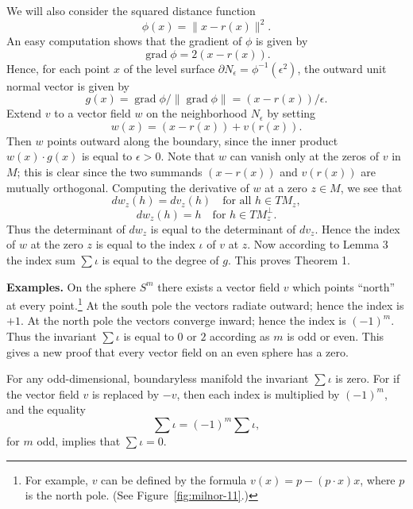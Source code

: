 We will also consider the squared distance function
\[
\phi(x) = \|x - r(x)\|^2.
\]
An easy computation shows that the gradient of $\phi$ is given by
\[
\operatorname{grad} \phi = 2(x - r(x)).
\]
Hence, for each point $x$ of the level surface $\partial N_\epsilon = \phi^{-1}(\epsilon^2)$, the outward unit normal vector is given by
\[
g(x) = \operatorname{grad} \phi / \|\operatorname{grad} \phi\| = (x - r(x))/\epsilon.
\]
Extend $v$ to a vector field $w$ on the neighborhood $N_\epsilon$ by setting
\[
w(x) = (x - r(x)) + v(r(x)).
\]
Then $w$ points outward along the boundary, since the inner product $w(x) \cdot g(x)$ is equal to $\epsilon > 0$. Note that $w$ can vanish only at the zeros of $v$ in $M$; this is clear since the two summands $(x - r(x))$ and $v(r(x))$ are mutually orthogonal. Computing the derivative of $w$ at a zero $z \in M$, we see that
\[
dw_z(h) = dv_z(h) \quad \text{for all } h \in TM_z,
\]
\[
dw_z(h) = h \quad \text{for } h \in TM_z^{\perp}.
\]
Thus the determinant of $dw_z$ is equal to the determinant of $dv_z$. Hence the index of $w$ at the zero $z$ is equal to the index $\iota$ of $v$ at $z$. Now according to Lemma 3 the index sum $\sum \iota$ is equal to the degree of $g$. This proves Theorem 1.

\noindent\textbf{Examples.} On the sphere $S^m$ there exists a vector field $v$ which points ``north'' at every point.\footnote{For example, $v$ can be defined by the formula $v(x) = p - (p \cdot x)x$, where $p$ is the north pole. (See Figure~\ref{fig:milnor-11}.)} At the south pole the vectors radiate outward; hence the index is $+1$. At the north pole the vectors converge inward; hence the index is $(-1)^m$. Thus the invariant $\sum \iota$ is equal to $0$ or $2$ according as $m$ is odd or even. This gives a new proof that every vector field on an even sphere has a zero.

For any odd-dimensional, boundaryless manifold the invariant $\sum \iota$ is zero. For if the vector field $v$ is replaced by $-v$, then each index is multiplied by $(-1)^m$, and the equality
\[
\sum \iota = (-1)^m \sum \iota,
\]
for $m$ odd, implies that $\sum \iota = 0$.

